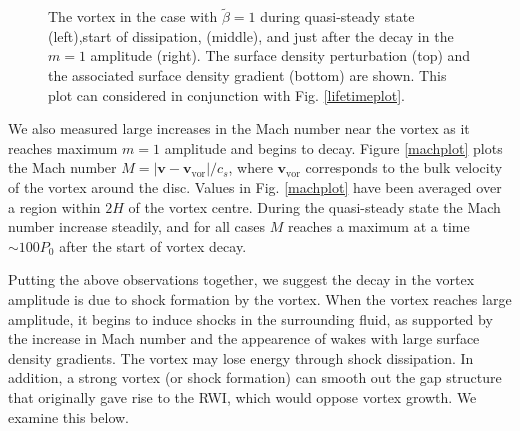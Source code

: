 \begin{figure}
{  }
  \hfill
  \caption{The vortex in the case with $\tilde{\beta}=1$
    during quasi-steady state (left),start of dissipation, 
    (middle), and just after the decay in the $m=1$ amplitude
    (right). The surface density perturbation
    (top) and the associated surface density gradient (bottom) are
    shown. This plot can considered in conjunction with
    Fig. \ref{lifetimeplot}. 
    \label{shockplot}}
\end{figure}

We also measured large increases in the Mach number near
the vortex as it reaches maximum $m=1$ amplitude and begins to decay. 
Figure \ref{machplot} plots the Mach number $M=|\bm{v} -
\bm{v}_\mathrm{vor}|/c_s$, where 
$\bm{v}_\mathrm{vor}$ corresponds to the bulk velocity of the vortex
around the disc. Values in Fig. \ref{machplot} have been averaged over
a region within $2H$ of the vortex centre. 
During the quasi-steady state the Mach number increase
steadily, and for all cases $M$ reaches a maximum at 
a time $\sim 100P_0$ after the start of vortex decay.

Putting the above observations together, we suggest the decay
in the vortex amplitude is due to shock formation by the
vortex. When the vortex reaches large amplitude, it begins
to induce shocks in the surrounding fluid, as supported by the
increase in Mach number and the appearence of wakes with large surface
density gradients. The vortex may lose energy through shock
dissipation. In addition, a strong vortex (or shock formation) 
can smooth out the gap structure that originally gave rise to the
RWI, which would oppose vortex growth. We examine this below.

